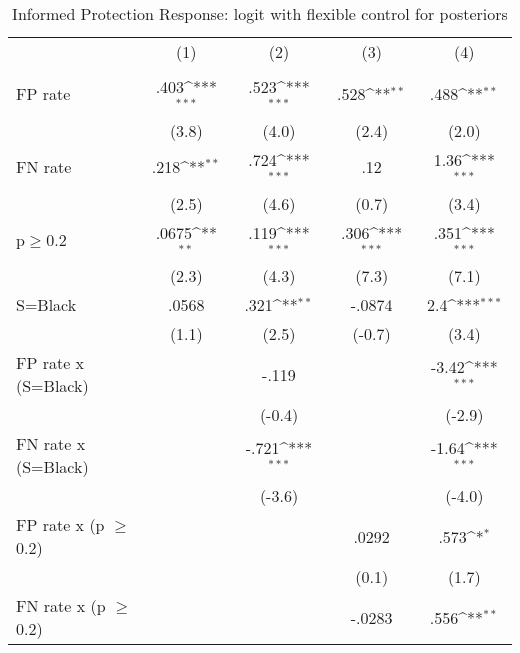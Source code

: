 \begin{table}[htbp]\centering
\def\sym#1{\ifmmode^{#1}\else\(^{#1}\)\fi}
\caption{Informed Protection Response: logit with flexible control for posteriors}
\begin{tabular}{l*{4}{c}}
\hline\hline
                &\multicolumn{1}{c}{(1)}&\multicolumn{1}{c}{(2)}&\multicolumn{1}{c}{(3)}&\multicolumn{1}{c}{(4)}\\
                &\multicolumn{1}{c}{}&\multicolumn{1}{c}{}&\multicolumn{1}{c}{}&\multicolumn{1}{c}{}\\
\hline
FP rate         &     .403\sym{***}&     .523\sym{***}&     .528\sym{**} &     .488\sym{**} \\
                &    (3.8)         &    (4.0)         &    (2.4)         &    (2.0)         \\
FN rate         &     .218\sym{**} &     .724\sym{***}&      .12         &     1.36\sym{***}\\
                &    (2.5)         &    (4.6)         &    (0.7)         &    (3.4)         \\
p$\geq$0.2      &    .0675\sym{**} &     .119\sym{***}&     .306\sym{***}&     .351\sym{***}\\
                &    (2.3)         &    (4.3)         &    (7.3)         &    (7.1)         \\
S=Black         &    .0568         &     .321\sym{**} &   -.0874         &      2.4\sym{***}\\
                &    (1.1)         &    (2.5)         &   (-0.7)         &    (3.4)         \\
FP rate x (S=Black)&                  &    -.119         &                  &    -3.42\sym{***}\\
                &                  &   (-0.4)         &                  &   (-2.9)         \\
FN rate x (S=Black)&                  &    -.721\sym{***}&                  &    -1.64\sym{***}\\
                &                  &   (-3.6)         &                  &   (-4.0)         \\
FP rate x (p $\geq$ 0.2)&                  &                  &    .0292         &     .573\sym{*}  \\
                &                  &                  &    (0.1)         &    (1.7)         \\
FN rate x (p $\geq$ 0.2)&                  &                  &   -.0283         &     .556\sym{**} \\

\end{tabular}
\end{table}
